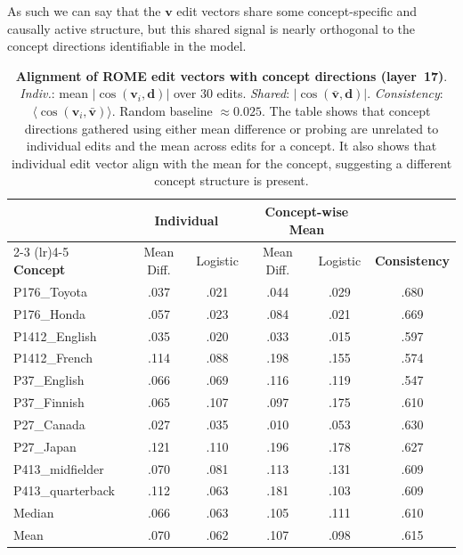 \documentclass[11pt,a4paper]{article}
\newcommand{\vv}{\mathbf{v}}
\begin{document}
As such we can say that the $\vv$ edit vectors share some concept-specific and causally active structure, but this shared signal is nearly orthogonal to the concept directions identifiable in the model.




\begin{table}[t]
\centering
\small
\begin{tabular}{l cc cc |c}
\toprule
& \multicolumn{2}{c}{Individual} & \multicolumn{2}{c}{Concept-wise Mean} & \multicolumn{1}{|c}{}\\
\cmidrule(lr){2-3} \cmidrule(lr){4-5}
\textbf{Concept} & Mean Diff. & Logistic & Mean Diff. & Logistic & \textbf{Consistency} \\
\midrule
P176\_Toyota      & .037 & .021 & .044 & .029 & .680 \\
P176\_Honda       & .057 & .023 & .084 & .021 & .669 \\
P1412\_English    & .035 & .020 & .033 & .015 & .597 \\
P1412\_French     & .114 & .088 & .198 & .155 & .574 \\
P37\_English      & .066 & .069 & .116 & .119 & .547 \\
P37\_Finnish      & .065 & .107 & .097 & .175 & .610 \\
P27\_Canada       & .027 & .035 & .010 & .053 & .630 \\
P27\_Japan        & .121 & .110 & .196 & .178 & .627 \\
P413\_midfielder   & .070 & .081 & .113 & .131 & .609 \\
P413\_quarterback    & .112 & .063 & .181 & .103 & .609 \\
\midrule
Median            & .066 & .063 & .105 & .111 & .610 \\
Mean              & .070 & .062 & .107 & .098 & .615 \\
\bottomrule
\end{tabular}
\caption{\textbf{Alignment of ROME edit vectors with concept directions (layer~17)}. \textit{Indiv.}: mean $|\cos(\mathbf{v}_i, \mathbf{d})|$ over 30 edits. \textit{Shared}: $|\cos(\bar{\mathbf{v}}, \mathbf{d})|$. \textit{Consistency}: $\langle\cos(\mathbf{v}_i, \bar{\mathbf{v}})\rangle$. Random baseline $\approx 0.025$. The table shows that concept directions gathered using either mean difference or probing are unrelated to individual edits and the mean across edits for a concept. It also shows that individual edit vector align with the mean for the concept, suggesting a different concept structure is present.
\label{tab:alignment}
}

\end{table}
\end{document}
